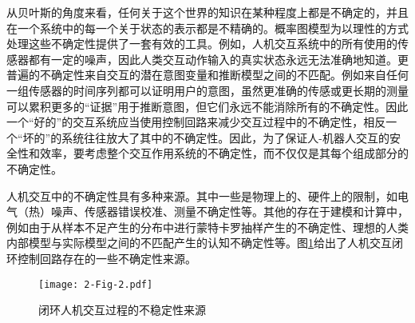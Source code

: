从贝叶斯的角度来看，任何关于这个世界的知识在某种程度上都是不确定的，并且在一个系统中的每一个关于状态的表示都是不精确的。概率图模型为以理性的方式处理这些不确定性提供了一套有效的工具。例如，人机交互系统中的所有使用的传感器都有一定的噪声，因此人类交互动作输入的真实状态永远无法准确地知道。更普遍的不确定性来自交互的潜在意图变量和推断模型之间的不匹配。例如来自任何一组传感器的时间序列都可以证明用户的意图，虽然更准确的传感或更长期的测量可以累积更多的``证据''用于推断意图，但它们永远不能消除所有的不确定性。因此一个``好的''的交互系统应当使用控制回路来减少交互过程中的不确定性，相反一个``坏的''的系统往往放大了其中的不确定性。因此，为了保证人-机器人交互的安全性和效率，要考虑整个交互作用系统的不确定性，而不仅仅是其每个组成部分的不确定性。

人机交互中的不确定性具有多种来源。其中一些是物理上的、硬件上的限制，如电气（热）噪声、传感器错误校准、测量不确定性等。其他的存在于建模和计算中，例如由于从样本不足产生的分布中进行蒙特卡罗抽样产生的不确定性、理想的人类内部模型与实际模型之间的不匹配产生的认知不确定性等。图\ref{fig:2-2}给出了人机交互闭环控制回路存在的一些不确定性来源。

\begin{figure}[h]
    \centering
    \texttt{[image: 2-Fig-2.pdf]}
    \caption{闭环人机交互过程的不稳定性来源}
    \label{fig:2-2}
\end{figure}

